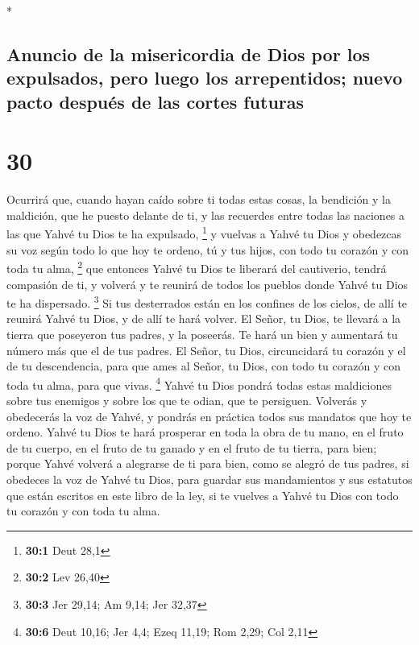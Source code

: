 \begin{paracol}{2}
\switchcolumn[0]*

\hypertarget{anuncio-de-la-misericordia-de-dios-por-los-expulsados-pero-luego-los-arrepentidos-nuevo-pacto-despuuxe9s-de-las-cortes-futuras}{%
\subsection{Anuncio de la misericordia de Dios por los expulsados, pero
luego los arrepentidos; nuevo pacto después de las cortes
futuras}\label{anuncio-de-la-misericordia-de-dios-por-los-expulsados-pero-luego-los-arrepentidos-nuevo-pacto-despuuxe9s-de-las-cortes-futuras}}

\hypertarget{section-58}{%
\section{30}\label{section-58}}

 Ocurrirá que, cuando hayan caído sobre ti todas estas
cosas, la bendición y la maldición, que he puesto delante de ti, y las
recuerdes entre todas las naciones a las que Yahvé tu Dios te ha
expulsado, \footnote{\textbf{30:1} Deut 28,1}  y vuelvas a
Yahvé tu Dios y obedezcas su voz según todo lo que hoy te ordeno, tú y
tus hijos, con todo tu corazón y con toda tu alma, \footnote{\textbf{30:2}
  Lev 26,40}  que entonces Yahvé tu Dios te liberará del
cautiverio, tendrá compasión de ti, y volverá y te reunirá de todos los
pueblos donde Yahvé tu Dios te ha dispersado. \footnote{\textbf{30:3}
  Jer 29,14; Am 9,14; Jer 32,37}  Si tus desterrados están
en los confines de los cielos, de allí te reunirá Yahvé tu Dios, y de
allí te hará volver.  El Señor, tu Dios, te llevará a la
tierra que poseyeron tus padres, y la poseerás. Te hará un bien y
aumentará tu número más que el de tus padres.  El Señor,
tu Dios, circuncidará tu corazón y el de tu descendencia, para que ames
al Señor, tu Dios, con todo tu corazón y con toda tu alma, para que
vivas. \footnote{\textbf{30:6} Deut 10,16; Jer 4,4; Ezeq 11,19; Rom
  2,29; Col 2,11}  Yahvé tu Dios pondrá todas estas
maldiciones sobre tus enemigos y sobre los que te odian, que te
persiguen.  Volverás y obedecerás la voz de Yahvé, y
pondrás en práctica todos sus mandatos que hoy te ordeno. 
Yahvé tu Dios te hará prosperar en toda la obra de tu mano, en el fruto
de tu cuerpo, en el fruto de tu ganado y en el fruto de tu tierra, para
bien; porque Yahvé volverá a alegrarse de ti para bien, como se alegró
de tus padres,  si obedeces la voz de Yahvé tu Dios, para
guardar sus mandamientos y sus estatutos que están escritos en este
libro de la ley, si te vuelves a Yahvé tu Dios con todo tu corazón y con
toda tu alma.


\end{paracol}
